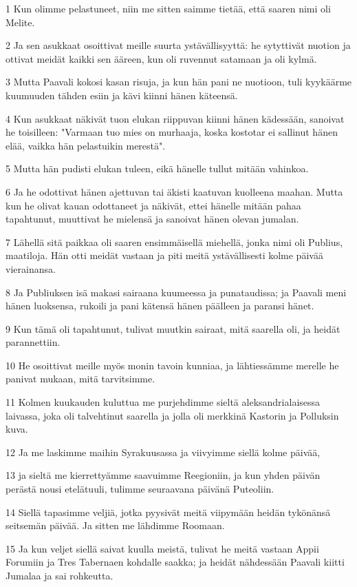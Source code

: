 \par 1 Kun olimme pelastuneet, niin me sitten saimme tietää, että saaren nimi oli Melite.
\par 2 Ja sen asukkaat osoittivat meille suurta ystävällisyyttä: he sytyttivät nuotion ja ottivat meidät kaikki sen ääreen, kun oli ruvennut satamaan ja oli kylmä.
\par 3 Mutta Paavali kokosi kasan risuja, ja kun hän pani ne nuotioon, tuli kyykäärme kuumuuden tähden esiin ja kävi kiinni hänen käteensä.
\par 4 Kun asukkaat näkivät tuon elukan riippuvan kiinni hänen kädessään, sanoivat he toisilleen: "Varmaan tuo mies on murhaaja, koska kostotar ei sallinut hänen elää, vaikka hän pelastuikin merestä".
\par 5 Mutta hän pudisti elukan tuleen, eikä hänelle tullut mitään vahinkoa.
\par 6 Ja he odottivat hänen ajettuvan tai äkisti kaatuvan kuolleena maahan. Mutta kun he olivat kauan odottaneet ja näkivät, ettei hänelle mitään pahaa tapahtunut, muuttivat he mielensä ja sanoivat hänen olevan jumalan.
\par 7 Lähellä sitä paikkaa oli saaren ensimmäisellä miehellä, jonka nimi oli Publius, maatiloja. Hän otti meidät vastaan ja piti meitä ystävällisesti kolme päivää vierainansa.
\par 8 Ja Publiuksen isä makasi sairaana kuumeessa ja punataudissa; ja Paavali meni hänen luoksensa, rukoili ja pani kätensä hänen päälleen ja paransi hänet.
\par 9 Kun tämä oli tapahtunut, tulivat muutkin sairaat, mitä saarella oli, ja heidät parannettiin.
\par 10 He osoittivat meille myös monin tavoin kunniaa, ja lähtiessämme merelle he panivat mukaan, mitä tarvitsimme.
\par 11 Kolmen kuukauden kuluttua me purjehdimme sieltä aleksandrialaisessa laivassa, joka oli talvehtinut saarella ja jolla oli merkkinä Kastorin ja Polluksin kuva.
\par 12 Ja me laskimme maihin Syrakuusassa ja viivyimme siellä kolme päivää,
\par 13 ja sieltä me kierrettyämme saavuimme Reegioniin, ja kun yhden päivän perästä nousi etelätuuli, tulimme seuraavana päivänä Puteoliin.
\par 14 Siellä tapasimme veljiä, jotka pyysivät meitä viipymään heidän tykönänsä seitsemän päivää. Ja sitten me lähdimme Roomaan.
\par 15 Ja kun veljet siellä saivat kuulla meistä, tulivat he meitä vastaan Appii Forumiin ja Tres Tabernaen kohdalle saakka; ja heidät nähdessään Paavali kiitti Jumalaa ja sai rohkeutta.
